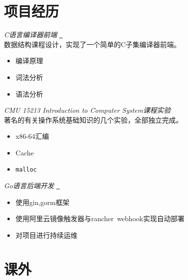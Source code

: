 \documentclass{uniquecv}
\begin{document}


\section{项目经历}

{\it C语言编译器前端}
\quad \href{https://github.com/colinaaa/hello-ds}{{\color{gray}{\faLink}}~}
\vspace{0.4ex}
\\
数据结构课程设计，实现了一个简单的C子集编译器前端。
\begin{itemize}
  \item 编译原理
  \item 词法分析
  \item 语法分析
\end{itemize}

{\it CMU 15213 Introduction to Computer System课程实验}
\vspace{0.4ex}
\\
著名的有关操作系统基础知识的几个实验，全部独立完成。
\begin{itemize}
  \item x86-64汇编
  \item Cache
  \item {\tt malloc}
\end{itemize}

\textit{Go语言后端开发}
\quad \href{https://github.com/colinaaa/UniqueHackDayDashboard-backend}{{\color{gray}{\faLink}}~}
\vspace{0.4ex}

\begin{itemize}
  \item 使用gin,gorm框架
  \item 使用阿里云镜像触发器与rancher\ webhook实现自动部署
  \item 对项目进行持续运维
\end{itemize}


\section{课外}
\end{document}
